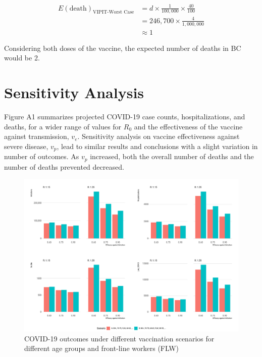 $$
\begin{aligned}
E(\text{death})_{\text{VIPIT-Worst Case}} & = d \times \frac{1}{100,000} \times \frac{40}{100} \\
& = 246,700 \times \frac{4}{1,000,000} \\
& \approx 1
\end{aligned}
$$

Considering both doses of the vaccine, the expected number of deaths in BC would be 2. 

\section{Sensitivity Analysis}

Figure A1 summarizes projected COVID-19 case counts, hospitalizations, and deaths, for a wider range of values for $R_0$ and the effectiveness of the vaccine against transmission, $v_e$. Sensitivity analysis on vaccine effectiveness against severe disease, $v_p$, lead to similar results and conclusions with a slight variation in number of outcomes. As $v_p$ increased, both the overall number of deaths and the number of deaths prevented decreased.

\begin{figure}[htb]
\begin{center}
\includegraphics[width=6in]{"../figures/fig-barplots.pdf"}
\caption{COVID-19 outcomes under different vaccination scenarios for different age groups and front-line workers (FLW)}
\end{center}
\end{figure}


